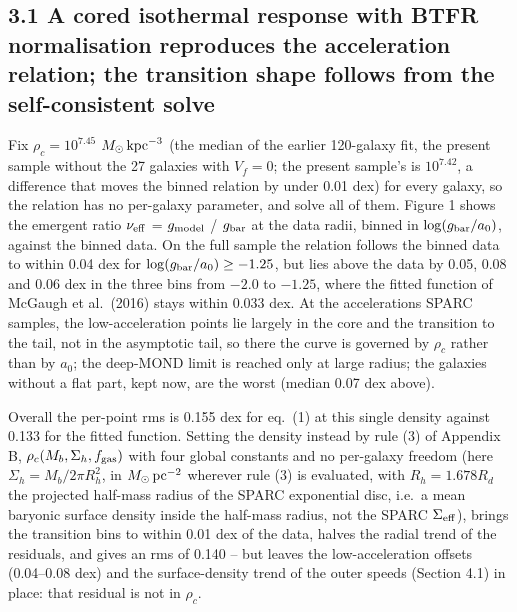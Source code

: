 \documentclass[
  10pt,
]{article}
\begin{document}
\subsection{3.1 A cored isothermal response with BTFR normalisation reproduces the acceleration relation; the transition shape follows from the self-consistent solve}\label{a-cored-isothermal-response-with-btfr-normalisation-reproduces-the-acceleration-relation-the-transition-shape-is-the-output}

Fix $\rho_c=10^{7.45}$ $M_\odot\,{\rm kpc}^{-3}$ (the median of the earlier 120-galaxy fit, the present sample without the 27 galaxies with $V_f=0$; the present sample's is $10^{7.42}$, a difference that moves the binned relation by under 0.01 dex) for every galaxy, so the relation has no per-galaxy parameter, and solve all of them. Figure 1 shows the emergent ratio $\nu_{\rm eff}$ = $g_{\rm model}$ / $g_{\rm bar}$ at the data radii, binned in $\log(g_{\rm bar}/a_0)$, against the binned data. On the full sample the relation follows the binned data to within 0.04 dex for $\log(g_{\rm bar}/a_0)\ge-1.25$, but lies above the data by 0.05, 0.08 and 0.06 dex in the three bins from $-2.0$ to $-1.25$, where the fitted function of McGaugh et al.~(2016) stays within 0.033 dex. At the accelerations SPARC samples, the low-acceleration points lie largely in the core and the transition to the tail, not in the asymptotic tail, so there the curve is governed by $\rho_c$ rather than by $a_0$; the deep-MOND limit is reached only at large radius; the galaxies without a flat part, kept now, are the worst (median 0.07 dex above).

Overall the per-point rms is 0.155 dex for eq.~(1) at this single density against 0.133 for the fitted function. Setting the density instead by rule (3) of Appendix B, $\rho_c(M_b,\Sigma_h,f_{\rm gas})$ with four global constants and no per-galaxy freedom (here $\Sigma_h=M_b/2\pi R_h^2$, in $M_\odot\,{\rm pc}^{-2}$ wherever rule (3) is evaluated, with $R_h=1.678R_d$ the projected half-mass radius of the SPARC exponential disc, i.e.\ a mean baryonic surface density inside the half-mass radius, not the SPARC $\Sigma_{\rm eff}$), brings the transition bins to within 0.01 dex of the data, halves the radial trend of the residuals, and gives an rms of 0.140 -- but leaves the low-acceleration offsets (0.04--0.08 dex) and the surface-density trend of the outer speeds (Section 4.1) in place: that residual is not in $\rho_c$.
\end{document}

